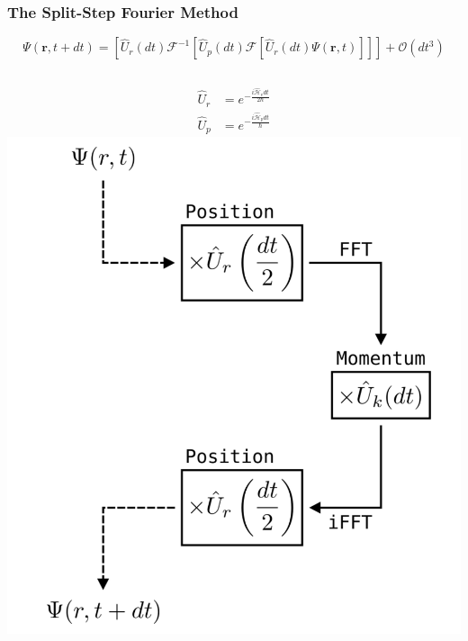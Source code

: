 \documentclass{beamer}
\begin{document}
\begin{frame}
\frametitle{The Split-Step Fourier Method}
\begin{equation*}
\Psi(\mathbf{r}, t+dt) = \left[\hat{U}_r(dt)\mathcal{F}^{-1}\left[\hat{U}_p(dt) \mathcal{F} \left[\hat{U}_r(dt) \Psi(\mathbf{r},t) \right] \right] \right] + \mathcal{O}(dt^3)
\end{equation*}

\begin{columns}
\begin{align*}
\hat{U}_r &= e^{-\frac{i\mathcal{\hat{H}}_vdt}{2\hbar}} \\
\hat{U}_p &= e^{-\frac{i\mathcal{\hat{H}}_pdt}{\hbar}}
\end{align*}
\includegraphics[width=\textwidth]{../data/splitop/method/split_op_method.pdf}
\end{columns}
\end{frame}
\end{document}
